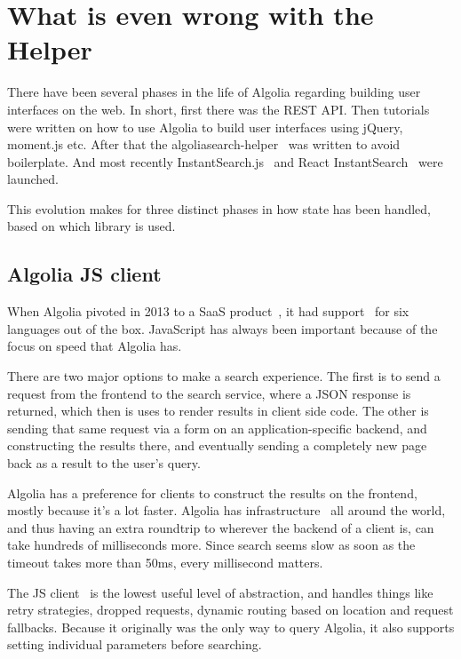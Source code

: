 
\section{What is even wrong with the Helper} %
\label{sec:what_is_even_wrong_with_the_helper}

There have been several phases in the life of Algolia regarding building user interfaces on the web. In short, first there was the REST API\@. Then tutorials were written on how to use Algolia to build user interfaces using jQuery, moment.js etc. After that the algoliasearch-helper~\cite{algolia-js-helper} was written to avoid boilerplate. And most recently InstantSearch.js~\cite{instantsearch-js} and React InstantSearch~\cite{react-instantsearch} were launched.

This evolution makes for three distinct phases in how state has been handled, based on which library is used.

\subsection{Algolia JS client} %
\label{sub:algolia_js_client}

When Algolia pivoted in 2013 to a SaaS product~\cite{algolia-blog-saas}, it had support~\cite{algolia-blog-lauch} for six languages out of the box. JavaScript has always been important because of the focus on speed that Algolia has.

There are two major options to make a search experience. The first is to send a request from the frontend to the search service, where a JSON response is returned, which then is uses to render results in client side code. The other is sending that same request via a form on an application-specific backend, and constructing the results there, and eventually sending a completely new page back as a result to the user's query.

Algolia has a preference for clients to construct the results on the frontend, mostly because it's a lot faster. Algolia has infrastructure~\cite{algolia-infra} all around the world, and thus having an extra roundtrip to wherever the backend of a client is, can take hundreds of milliseconds more. Since search seems slow as soon as the timeout takes more than 50ms, every millisecond matters.

The JS client~\cite{algolia-js-client} is the lowest useful level of abstraction, and handles things like retry strategies, dropped requests, dynamic routing based on location and request fallbacks. Because it originally was the only way to query Algolia, it also supports setting individual parameters before searching.

